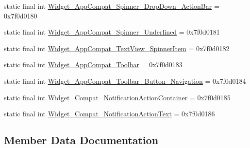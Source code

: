 \begin{DoxyCompactItemize}
\item 
static final int \mbox{\hyperlink{classandroid_1_1support_1_1v7_1_1appcompat_1_1R_1_1style_a6190a954e4f0646a2b8de6530e0bcd72}{Widget\+\_\+\+App\+Compat\+\_\+\+Spinner\+\_\+\+Drop\+Down\+\_\+\+Action\+Bar}} = 0x7f0d0180
\item 
static final int \mbox{\hyperlink{classandroid_1_1support_1_1v7_1_1appcompat_1_1R_1_1style_a185580641a1c211d234fd6a381680890}{Widget\+\_\+\+App\+Compat\+\_\+\+Spinner\+\_\+\+Underlined}} = 0x7f0d0181
\item 
static final int \mbox{\hyperlink{classandroid_1_1support_1_1v7_1_1appcompat_1_1R_1_1style_ae78217806d80f6d12c6be69d442ec4aa}{Widget\+\_\+\+App\+Compat\+\_\+\+Text\+View\+\_\+\+Spinner\+Item}} = 0x7f0d0182
\item 
static final int \mbox{\hyperlink{classandroid_1_1support_1_1v7_1_1appcompat_1_1R_1_1style_a09461e6cdfb963d2621f721c73f9c64d}{Widget\+\_\+\+App\+Compat\+\_\+\+Toolbar}} = 0x7f0d0183
\item 
static final int \mbox{\hyperlink{classandroid_1_1support_1_1v7_1_1appcompat_1_1R_1_1style_ab210292245646fce123ac455b8fa3870}{Widget\+\_\+\+App\+Compat\+\_\+\+Toolbar\+\_\+\+Button\+\_\+\+Navigation}} = 0x7f0d0184
\item 
static final int \mbox{\hyperlink{classandroid_1_1support_1_1v7_1_1appcompat_1_1R_1_1style_a1633e6362d69dd329e83c61ab99560f6}{Widget\+\_\+\+Compat\+\_\+\+Notification\+Action\+Container}} = 0x7f0d0185
\item 
static final int \mbox{\hyperlink{classandroid_1_1support_1_1v7_1_1appcompat_1_1R_1_1style_a18e9124d71139940e68076f3be26805b}{Widget\+\_\+\+Compat\+\_\+\+Notification\+Action\+Text}} = 0x7f0d0186
\end{DoxyCompactItemize}


\subsection{Member Data Documentation}
\mbox{\label{classandroid_1_1support_1_1v7_1_1appcompat_1_1R_1_1style_a7a80ce426bb2017e2b8138a6b04a04c8}} 
